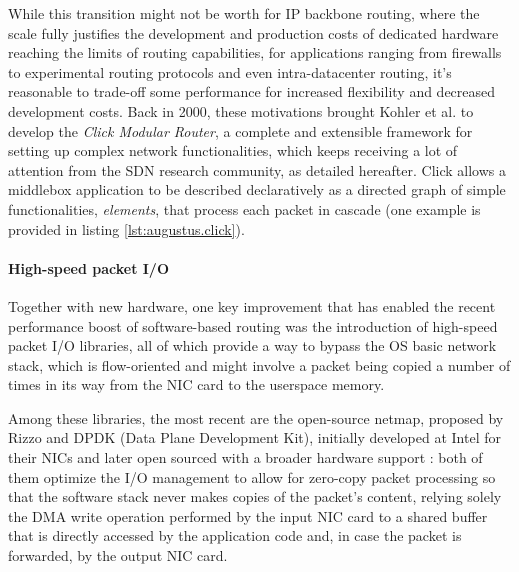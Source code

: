 \documentclass[11pt,a4paper,twoside,titlepage,openany]{book}
\begin{document}
While this transition might not be worth for IP backbone routing, where the scale fully justifies the development and production costs of dedicated hardware reaching the limits of routing capabilities, for applications ranging from firewalls to experimental routing protocols and even intra-datacenter routing, it's reasonable to trade-off some performance for increased flexibility and decreased development costs.
Back in 2000, these motivations brought Kohler et al. \cite{click} to develop the \emph{Click Modular Router}, a complete and extensible framework for setting up complex network functionalities, which keeps receiving a lot of attention from the \gls{SDN} research community, as detailed hereafter. Click allows a middlebox application to be described declaratively as a directed graph of simple functionalities, \emph{elements}, that process each packet in cascade (one example is provided in listing \ref{lst:augustus.click}).

\paragraph{High-speed packet I/O} Together with new hardware, one key improvement that has enabled the recent performance boost of software-based routing was the introduction of high-speed packet I/O libraries, all of which provide a way to bypass the OS basic network stack, which is flow-oriented and might involve a packet being copied a number of times in its way from the NIC card to the userspace memory. %

Among these libraries, the most recent are the open-source netmap, proposed by Rizzo \cite{netmap} and DPDK (Data Plane Development Kit), initially developed at Intel for their NICs and later open sourced with a broader hardware support \cite{dpdk}%
: both of them optimize the I/O management to allow for zero-copy packet processing so that the software stack never makes copies of the packet's content, relying solely the \gls{DMA} write operation performed by the input NIC card to a shared buffer that is directly accessed by the application code and, in case the packet is forwarded, by the output NIC card.
\end{document}

